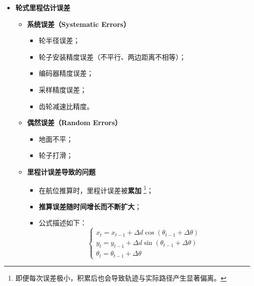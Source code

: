 \documentclass[../main.tex]{subfiles}
\begin{document}
\begin{enumerate}
\begin{itemize}
            \item \textbf{轮式里程估计误差}
            \begin{itemize}
                \item \textbf{系统误差（Systematic Errors）}
                \begin{itemize}
                    \item 轮半径误差；
                    \item 轮子安装精度误差（不平行、两边距离不相等）；
                    \item 编码器精度误差；
                    \item 采样精度误差；
                    \item 齿轮减速比精度。
                \end{itemize}
    
                \item \textbf{偶然误差（Random Errors）}
                \begin{itemize}
                    \item 地面不平；
                    \item 轮子打滑；
                \end{itemize}
    
                \item \textbf{里程计误差导致的问题}
                \begin{itemize}
                    \item 在航位推算时，里程计误差被\textbf{累加}                    \footnote{即便每次误差极小，积累后也会导致轨迹与实际路径产生显著偏离。}；
                    \item \textbf{推算误差随时间增长而不断扩大}；
                    \item 公式描述如下：
                    \[
                    \begin{cases}
                    x_t = x_{t-1} + \Delta d \cos(\theta_{t-1} + \Delta\theta) \\
                    y_t = y_{t-1} + \Delta d \sin(\theta_{t-1} + \Delta\theta) \\
                    \theta_t = \theta_{t-1} + \Delta\theta
                    \end{cases}
                    \]


\end{itemize}
\end{itemize}
\end{itemize}
\end{enumerate}
\end{document}
